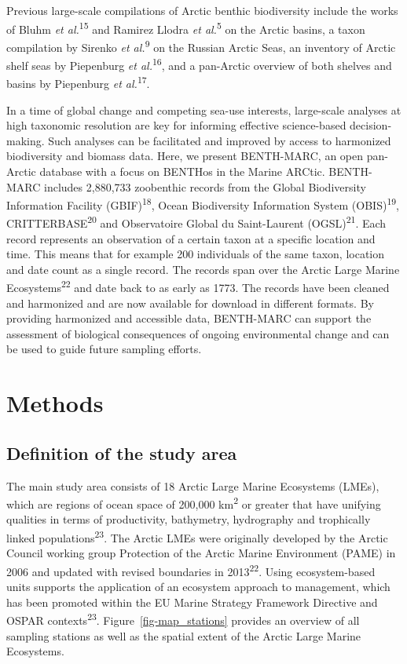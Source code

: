 \documentclass[
  letterpaper,
  DIV=11,
  numbers=noendperiod]{scrartcl}
\begin{document}
Previous large-scale compilations of Arctic benthic biodiversity include
the works of Bluhm \emph{et al.}\textsuperscript{15} and Ramirez Llodra
\emph{et al.}\textsuperscript{5} on the Arctic basins, a taxon
compilation by Sirenko \emph{et al.}\textsuperscript{9} on the Russian
Arctic Seas, an inventory of Arctic shelf seas by Piepenburg \emph{et
al.}\textsuperscript{16}, and a pan-Arctic overview of both shelves and
basins by Piepenburg \emph{et al.}\textsuperscript{17}.

In a time of global change and competing sea-use interests, large-scale
analyses at high taxonomic resolution are key for informing effective
science-based decision-making. Such analyses can be facilitated and
improved by access to harmonized biodiversity and biomass data. Here, we
present BENTH-MARC, an open pan-Arctic database with a focus on BENTHos
in the Marine ARCtic. BENTH-MARC includes 2,880,733 zoobenthic records
from the Global Biodiversity Information Facility
(GBIF)\textsuperscript{18}, Ocean Biodiversity Information System
(OBIS)\textsuperscript{19}, CRITTERBASE\textsuperscript{20} and
Observatoire Global du Saint-Laurent (OGSL)\textsuperscript{21}. Each
record represents an observation of a certain taxon at a specific
location and time. This means that for example 200 individuals of the
same taxon, location and date count as a single record. The records span
over the Arctic Large Marine Ecosystems\textsuperscript{22} and date
back to as early as 1773. The records have been cleaned and harmonized
and are now available for download in different formats. By providing
harmonized and accessible data, BENTH-MARC can support the assessment of
biological consequences of ongoing environmental change and can be used
to guide future sampling efforts.

\section{Methods}\label{methods}

\subsection{Definition of the study
area}\label{definition-of-the-study-area}

The main study area consists of 18 Arctic Large Marine Ecosystems
(LMEs), which are regions of ocean space of 200,000
km\textsuperscript{2} or greater that have unifying qualities in terms
of productivity, bathymetry, hydrography and trophically linked
populations\textsuperscript{23}. The Arctic LMEs were originally
developed by the Arctic Council working group Protection of the Arctic
Marine Environment (PAME) in 2006 and updated with revised boundaries in
2013\textsuperscript{22}. Using ecosystem-based units supports the
application of an ecosystem approach to management, which has been
promoted within the EU Marine Strategy Framework Directive and OSPAR
contexts\textsuperscript{23}. Figure~\ref{fig-map_stations} provides an
overview of all sampling stations as well as the spatial extent of the
Arctic Large Marine Ecosystems.
\end{document}
